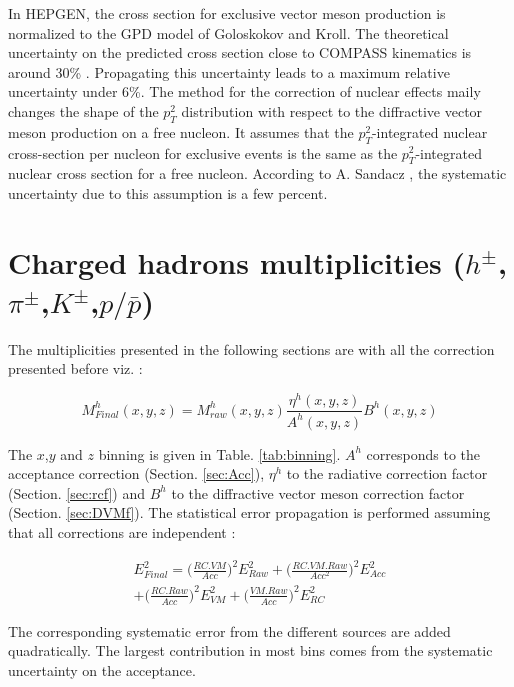 In HEPGEN, the cross section for exclusive vector meson production is normalized to the GPD model of Goloskokov and Kroll. The theoretical uncertainty on the predicted cross section close to COMPASS kinematics is around 30\% \cite{Goloskokov}. Propagating this uncertainty leads to a maximum relative uncertainty under 6\%.
The method for the correction of nuclear effects maily changes the shape of the $p_T^2$ distribution with respect to the diffractive vector meson production on a free nucleon. It assumes that the $p_T^2$-integrated nuclear cross-section per nucleon for exclusive events is the same as the $p_T^2$-integrated nuclear cross section for a free nucleon. According to A. Sandacz \cite{Hepgen}, the systematic uncertainty due to this assumption is a few percent.


\section{Charged hadrons multiplicities ($h^{\pm}$,$\pi^{\pm}$,$K^{\pm}$,$p/\bar{p}$)}

The multiplicities presented in the following sections are with all the correction presented before viz. :

\begin{equation}
  	M^h_{Final}(x,y,z) = M^h_{raw}(x,y,z)\frac{\eta^h(x,y,z)}{A^h(x,y,z)}B^h(x,y,z)
\end{equation}

The $x$,$y$ and $z$ binning is given in Table. \ref{tab:binning}. $A^h$ corresponds to the acceptance correction (Section. \ref{sec:Acc}), $\eta^h$ to the radiative correction factor (Section. \ref{sec:rcf}) and $B^h$ to the diffractive vector meson correction factor (Section. \ref{sec:DVMf}). The statistical error propagation is performed assuming that all corrections are independent :

\begin{equation}
\begin{split}
		E^2_{Final} = \bigg( \frac{RC.VM}{Acc} \bigg)^2 E^2_{Raw} + \bigg(\frac{RC.VM.Raw}{Acc^2} \bigg)^2 E^2_{Acc} \\
		+ \bigg(\frac{RC.Raw}{Acc} \bigg)^2 E^2_{VM} + \bigg(\frac{VM.Raw}{Acc} \bigg)^2 E^2_{RC}
\end{split}
\end{equation}

The corresponding systematic error from the different sources are added quadratically. The largest contribution in most bins comes from the systematic uncertainty on the acceptance.

